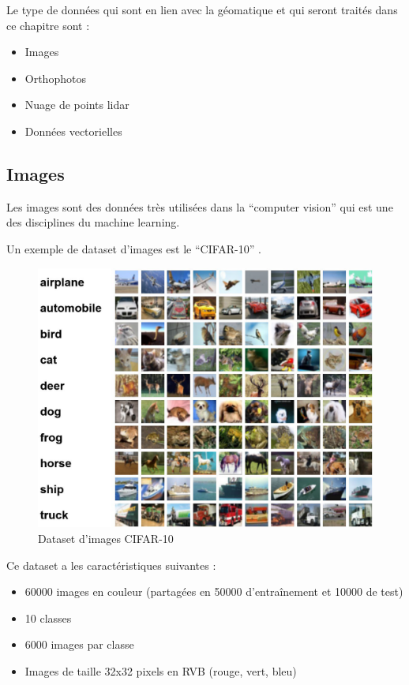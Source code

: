 Le type de données qui sont en lien avec la géomatique et qui seront traités dans ce chapitre sont :
\begin{itemize}
    \item Images
    \item Orthophotos
    \item Nuage de points \gls{lidar}
    \item Données vectorielles
\end{itemize}

\newpage
\subsection{Images}

Les images sont des données très utilisées dans la ``computer vision'' qui est une des disciplines du machine learning.

Un exemple de dataset d'images est le ``CIFAR-10'' \cite{krizhevsky_learning_2009}.

\begin{figure}[H]
    \centering
    \includegraphics[width=0.9\linewidth]{03-tail//A1_fondamentaux_ML//A1_figures/A1_09_cifar.png}
    \caption{Dataset d'images CIFAR-10 \cite{krizhevsky_cifar-10_nodate}}
    \label{fig:A1_09_cifar}
\end{figure}

Ce dataset a les caractéristiques suivantes :
\begin{itemize}
    \item 60000 images en couleur (partagées en 50000 d'entraînement et 10000 de test)
    \item 10 classes
    \item 6000 images par classe
    \item Images de taille 32x32 pixels en RVB (rouge, vert, bleu)
\end{itemize}

